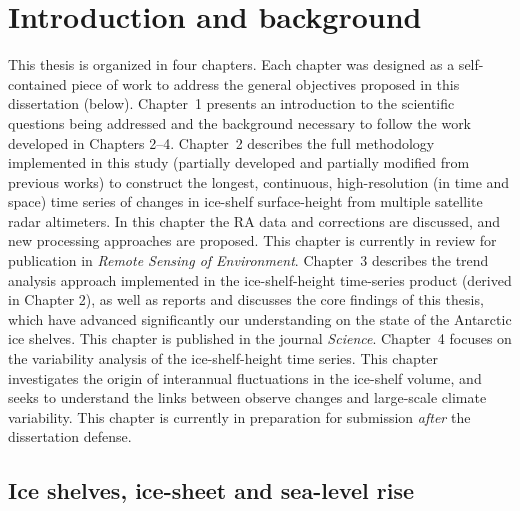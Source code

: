 


\chapter{Introduction and background}

This thesis is organized in four chapters. Each chapter was designed as a self-contained piece of work to address the general objectives proposed in this dissertation (below). {\sc Chapter~1} presents an introduction to the scientific questions being addressed and the background necessary to follow the work developed in Chapters 2--4. {\sc Chapter~2} describes the full methodology implemented in this study (partially developed and partially modified from previous works) to construct the longest, continuous, high-resolution (in time and space) time series of changes in ice-shelf surface-height from multiple satellite radar altimeters. In this chapter the RA data and corrections are discussed, and new processing approaches are proposed. This chapter is currently in review for publication in {\it Remote Sensing of Environment}. {\sc Chapter~3} describes the trend analysis approach implemented in the ice-shelf-height time-series product (derived in Chapter 2), as well as reports and discusses the core findings of this thesis, which have advanced significantly our understanding on the state of the Antarctic ice shelves. This chapter is published in the journal {\it Science}. {\sc Chapter~4} focuses on the variability analysis of the ice-shelf-height time series. This chapter investigates the origin of interannual fluctuations in the ice-shelf volume, and seeks to understand the links between observe changes and large-scale climate variability. This chapter is currently in preparation for submission \emph{after} the dissertation defense.


\section*{Ice shelves, ice-sheet and sea-level rise}

